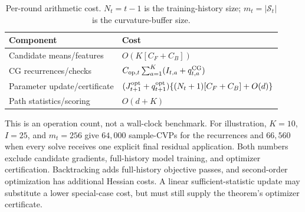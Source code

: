 \begin{table}[h]
\centering\ccetablesize
\caption{Per-round arithmetic cost.  $N_t=t-1$ is the training-history size;
$m_t=|\mathcal S_t|$ is the curvature-buffer size.}\label{tab:cost}
\begin{tabular}{@{}lp{5.2cm}@{}}
\toprule
Component & Cost \\
\midrule
Candidate means/features & $O(K[C_F+C_B])$ \\
CG recurrences/checks & $C_{{\rm op},t}\sum_{a=1}^K
 (I_{t,a}+q^{\rm CG}_{t,a})$ \\
Parameter update/certificate & $(J^{\rm opt}_{t+1}+q^{\rm opt}_{t+1})
 \{(N_t+1)[C_F+C_B]+O(d)\}$ \\
Path statistics/scoring & $O(d+K)$ \\
\bottomrule
\end{tabular}
\end{table}

\noindent
This is an operation count, not a wall-clock benchmark.  For illustration,
$K=10$, $I=25$, and $m_t=256$ give $64{,}000$ sample-CVPs for the recurrences
and $66{,}560$ when every solve receives one explicit final residual
application.  Both numbers exclude candidate gradients, full-history model
training, and optimizer certification.  Backtracking adds full-history objective
passes, and second-order optimization has additional Hessian costs.  A linear
sufficient-statistic update may substitute a lower special-case cost, but must
still supply the theorem's optimizer certificate.


